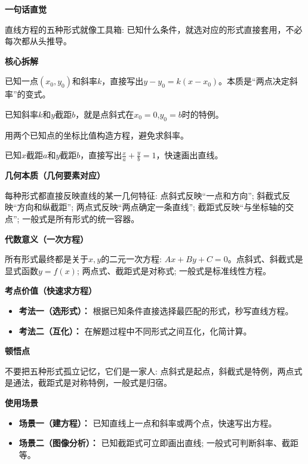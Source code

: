 \begin{explanationbox}

	\textbf{\textcolor{CExplanation}{一句话直觉}}

	直线方程的五种形式就像工具箱: 已知什么条件，就选对应的形式直接套用，不必每次都从头推导。

	\medskip
	\textbf{\textcolor{CExplanation}{核心拆解}}
	\begin{description}[style=nextline, leftmargin=2.8em, labelsep=0.5em, itemsep=0.45em]
		\item[\textbf{要点一（点斜式）：}] 已知一点$(x_0,y_0)$和斜率$k$，直接写出$y-y_0=k(x-x_0)$。本质是“两点决定斜率”的变式。
		\item[\textbf{要点二（斜截式）：}] 已知斜率$k$和$y$截距$b$，就是点斜式在$x_0=0$,$y_0=b$时的特例。
		\item[\textbf{要点三（两点式）：}] 用两个已知点的坐标比值构造方程，避免求斜率。
		\item[\textbf{要点四（截距式）：}] 已知$x$截距$a$和$y$截距$b$，直接写出$\frac{x}{a}+\frac{y}{b}=1$，快速画出直线。
	\end{description}

	\medskip
	\textbf{\textcolor{CExplanation}{几何本质（几何要素对应）}}

	每种形式都直接反映直线的某一几何特征: 点斜式反映“一点和方向”; 斜截式反映“方向和纵截距”; 两点式反映“两点确定一条直线”; 截距式反映“与坐标轴的交点”; 一般式是所有形式的统一容器。

	\medskip
	\textbf{\textcolor{CExplanation}{代数意义（一次方程）}}

	所有形式最终都是关于$x,y$的二元一次方程: $Ax+By+C=0$。点斜式、斜截式是显式函数$y=f(x)$; 两点式、截距式是对称式; 一般式是标准线性方程。

	\medskip
	\textbf{\textcolor{CExplanation}{考点价值（快速求方程）}}
	\begin{itemize}[leftmargin=*, itemsep=0.5em, topsep=0.4em]
		\item \textbf{考法一（选形式）：} 根据已知条件直接选择最匹配的形式，秒写直线方程。
		\item \textbf{考法二（互化）：} 在解题过程中不同形式之间互化，化简计算。
	\end{itemize}

	\medskip
	\textbf{\textcolor{CExplanation}{顿悟点}}

	不要把五种形式孤立记忆，它们是一家人: 点斜式是起点，斜截式是特例，两点式是通法，截距式是对称特例，一般式是归宿。

	\medskip
	\textbf{\textcolor{CExplanation}{使用场景}}
	\begin{itemize}[leftmargin=*, itemsep=0.5em, topsep=0.4em]
		\item \textbf{场景一（建方程）：} 已知直线上一点和斜率或两个点，快速写出方程。
		\item \textbf{场景二（图像分析）：} 已知截距式可立即画出直线; 一般式可判断斜率、截距等。
	\end{itemize}
\end{explanationbox}
